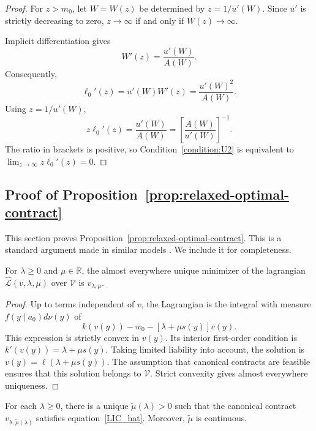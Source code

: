 \begin{proof}
For $z>m_0$, let $W=W(z)$ be determined by
$z=1/u'(W)$.  Since $u'$ is strictly decreasing to zero,
$z\to\infty$ if and only if $W(z)\to\infty$.

Implicit differentiation gives
\[
    W'(z)=\frac{u'(W)}{A(W)}.
\]
Consequently,
\[
    \ell_0'(z)
    =u'(W)W'(z)
    =\frac{u'(W)^2}{A(W)}.
\]
Using $z=1/u'(W)$,
\[
    z\ell_0'(z)
    =\frac{u'(W)}{A(W)}
    =\left[\frac{A(W)}{u'(W)}\right]^{-1}.
\]
The ratio in brackets is positive, so Condition~\eqref{condition:U2} is equivalent to
$\lim_{z\to\infty}z\ell_0'(z)=0$.
\end{proof}

\subsection{Proof of Proposition~\ref{prop:relaxed-optimal-contract}}
\label{subsec:appendix-relaxed}

This section proves Proposition~\ref{prop:relaxed-optimal-contract}. This is a standard argument made in similar models \parencite{holmstrom1978incentives,jewitt2008moral}. We include it for completeness.

\begin{lemma}
\label{lem:lagrangian}
For $\lambda\geq0$ and $\mu\in\mathbb R$, the almost everywhere unique
minimizer of the lagrangian $\widehat{\mathcal L}(v,\lambda,\mu)$ over $\mathcal V$ is
$v_{\lambda,\mu}$.
\end{lemma}

\begin{proof}
Up to terms independent of $v$, the Lagrangian is the integral with measure
$f(y\mid a_0)d\nu(y)$ of
\[
    k(v(y))-w_0-[\lambda+\mu s(y)]v(y).
\]
This expression is strictly convex in $v(y)$.  Its interior first-order
condition is $k'(v(y))=\lambda+\mu s(y)$.  Taking limited liability into account,
the solution is $v(y)=\ell(\lambda+\mu s(y))$.
The assumption that canonical contracts are feasible ensures that this solution belongs to $\mathcal V$.  Strict convexity gives almost
everywhere uniqueness.
\end{proof}

\begin{lemma}
\label{lem:mu-tilde}
For each $\lambda\geq0$, there is a unique $\widetilde\mu(\lambda)>0$ such
that the canonical contract $v_{\lambda,\widetilde\mu(\lambda)}$ satisfies
equation~\eqref{LIC_hat}.  Moreover, $\widetilde\mu$ is continuous.
\end{lemma}

